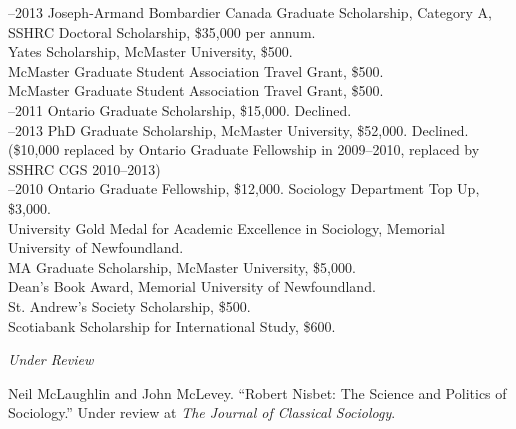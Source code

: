 \documentclass[11pt,usenames,dvipsnames]{article}
\begin{document}


–2013 Joseph-Armand Bombardier Canada Graduate Scholarship, Category A, SSHRC Doctoral Scholarship, \$35,000 per annum.\\

 Yates Scholarship, McMaster University, \$500.\\

 McMaster Graduate Student Association Travel Grant, \$500.\\

 McMaster Graduate Student Association Travel Grant, \$500.\\

–2011 Ontario Graduate Scholarship, \$15,000. Declined.\\

–2013 PhD Graduate Scholarship, McMaster University, \$52,000. Declined. (\$10,000 replaced by Ontario Graduate Fellowship in 2009–2010, replaced by SSHRC CGS 2010–2013)\\

–2010 Ontario Graduate Fellowship, \$12,000. Sociology Department Top Up, \$3,000.\\

 University Gold Medal for Academic Excellence in Sociology, Memorial University of Newfoundland.\\

 MA Graduate Scholarship, McMaster University, \$5,000.\\

 Dean's Book Award, Memorial University of Newfoundland.\\

 St. Andrew’s Society Scholarship, \$500.\\

 Scotiabank Scholarship for International Study, \$600.\\



\noindent\emph{Under Review \vspace{0.01in}}

\ind Neil McLaughlin and John McLevey. ``Robert Nisbet: The Science and Politics of Sociology.'' Under review at \textit{The Journal of Classical Sociology}.\\
\end{document}
